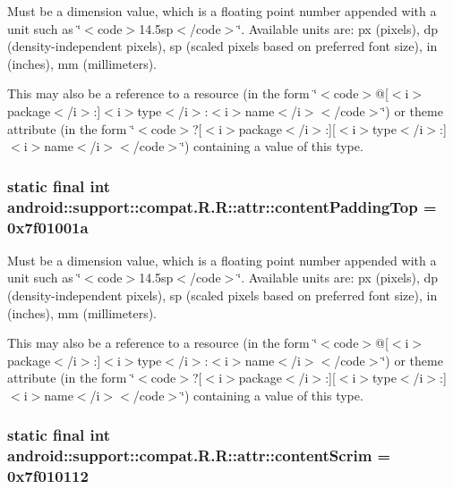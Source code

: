 Must be a dimension value, which is a floating point number appended with a unit such as \char`\"{}$<$code$>$14.5sp$<$/code$>$\char`\"{}. Available units are: px (pixels), dp (density-independent pixels), sp (scaled pixels based on preferred font size), in (inches), mm (millimeters). 

This may also be a reference to a resource (in the form \char`\"{}$<$code$>$@\mbox{[}$<$i$>$package$<$/i$>$:\mbox{]}$<$i$>$type$<$/i$>$:$<$i$>$name$<$/i$>$$<$/code$>$\char`\"{}) or theme attribute (in the form \char`\"{}$<$code$>$?\mbox{[}$<$i$>$package$<$/i$>$:\mbox{]}\mbox{[}$<$i$>$type$<$/i$>$:\mbox{]}$<$i$>$name$<$/i$>$$<$/code$>$\char`\"{}) containing a value of this type. \hypertarget{classandroid_1_1support_1_1compat_1_1_r_1_1attr_f90e566b223fa2d252b5b9a44f87c1af}{
\subsubsection[{contentPaddingTop}]{\setlength{\rightskip}{0pt plus 5cm}static final int android::support::compat.R.R::attr::contentPaddingTop = 0x7f01001a}}
\label{classandroid_1_1support_1_1compat_1_1_r_1_1attr_f90e566b223fa2d252b5b9a44f87c1af}


Must be a dimension value, which is a floating point number appended with a unit such as \char`\"{}$<$code$>$14.5sp$<$/code$>$\char`\"{}. Available units are: px (pixels), dp (density-independent pixels), sp (scaled pixels based on preferred font size), in (inches), mm (millimeters). 

This may also be a reference to a resource (in the form \char`\"{}$<$code$>$@\mbox{[}$<$i$>$package$<$/i$>$:\mbox{]}$<$i$>$type$<$/i$>$:$<$i$>$name$<$/i$>$$<$/code$>$\char`\"{}) or theme attribute (in the form \char`\"{}$<$code$>$?\mbox{[}$<$i$>$package$<$/i$>$:\mbox{]}\mbox{[}$<$i$>$type$<$/i$>$:\mbox{]}$<$i$>$name$<$/i$>$$<$/code$>$\char`\"{}) containing a value of this type. \hypertarget{classandroid_1_1support_1_1compat_1_1_r_1_1attr_09bc0fb539bd9dc40562ca3c0a800771}{
\subsubsection[{contentScrim}]{\setlength{\rightskip}{0pt plus 5cm}static final int android::support::compat.R.R::attr::contentScrim = 0x7f010112}}
\label{classandroid_1_1support_1_1compat_1_1_r_1_1attr_09bc0fb539bd9dc40562ca3c0a800771}


